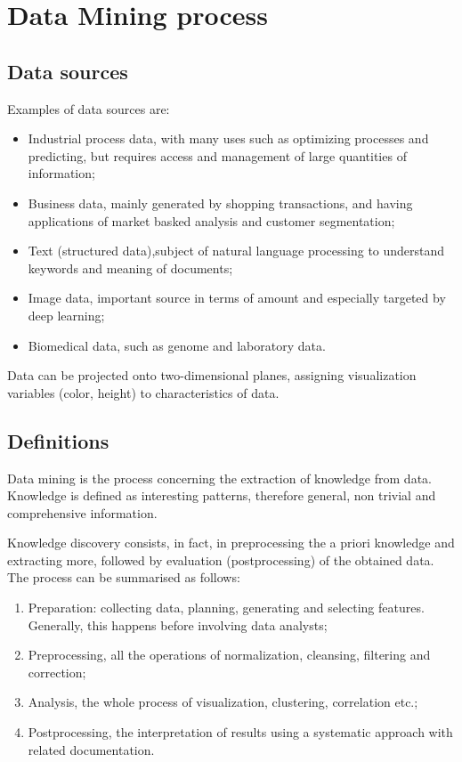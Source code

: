 \section{Data Mining process}

\subsection{Data sources}
Examples of data sources are: 
\begin{itemize}
	\item Industrial process data, with many uses such as optimizing processes and predicting, but requires access and management of large quantities of information;
	\item Business data, mainly generated by shopping transactions, and having applications of market basked analysis and customer segmentation;
	\item Text (structured data),subject of natural language processing to understand keywords and meaning of documents;
	\item Image data, important source in terms of amount and especially targeted by deep learning;
	\item Biomedical data, such as genome and laboratory data.
\end{itemize}

Data can be projected onto two-dimensional planes, assigning visualization variables (color, height) to characteristics of data.

\subsection{Definitions}
Data mining is the process concerning the extraction of knowledge from data. Knowledge is defined as interesting patterns, therefore general, non trivial and comprehensive information.

Knowledge discovery consists, in fact, in preprocessing the a priori knowledge and extracting more, followed by evaluation (postprocessing) of the obtained data. The process can be summarised as follows:
\begin{enumerate}
	\item Preparation: collecting data, planning, generating and selecting features. Generally, this happens before involving data analysts;
	\item Preprocessing, all the operations of normalization, cleansing, filtering and correction;
	\item Analysis, the whole process of visualization, clustering, correlation etc.;
	\item Postprocessing, the interpretation of results using a systematic approach with related documentation.
\end{enumerate}

